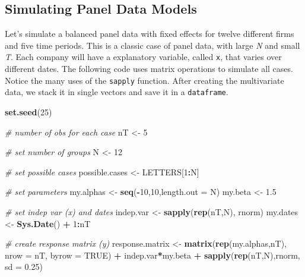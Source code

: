 \documentclass[11pt,]{book}
\newenvironment{Shaded}{\begin{snugshade}}{\end{snugshade}}
\newcommand{\KeywordTok}[1]{\textcolor[rgb]{0.27,0.27,0.27}{\textbf{#1}}}
\newcommand{\DataTypeTok}[1]{\textcolor[rgb]{0.27,0.27,0.27}{#1}}
\newcommand{\DecValTok}[1]{\textcolor[rgb]{0.06,0.06,0.06}{#1}}
\newcommand{\FloatTok}[1]{\textcolor[rgb]{0.06,0.06,0.06}{#1}}
\newcommand{\StringTok}[1]{\textcolor[rgb]{0.5,0.5,0.5}{#1}}
\newcommand{\CommentTok}[1]{\textcolor[rgb]{0.56,0.35,0.01}{\textit{#1}}}
\newcommand{\OtherTok}[1]{\textcolor[rgb]{0.56,0.35,0.01}{#1}}
\newcommand{\OperatorTok}[1]{\textcolor[rgb]{0.81,0.36,0.00}{\textbf{#1}}}
\newcommand{\NormalTok}[1]{#1}
\begin{document}
\subsection{Simulating Panel Data
Models}\label{simulating-panel-data-models}

Let's simulate a balanced panel data with fixed effects for twelve
different firms and five time periods. This is a classic case of panel
data, with large \emph{N} and small \emph{T}. Each company will have a
explanatory variable, called \texttt{x}, that varies over different
dates. The following code uses matrix operations to simulate all cases.
Notice the many uses of the \texttt{sapply} function. After creating the
multivariate data, we stack it in single vectors and save it in a
\texttt{dataframe}.

\begin{Shaded}
\begin{Highlighting}[]
\KeywordTok{set.seed}\NormalTok{(}\DecValTok{25}\NormalTok{)}

\CommentTok{# number of obs for each case}
\NormalTok{nT <-}\StringTok{ }\DecValTok{5}

\CommentTok{# set number of groups}
\NormalTok{N <-}\StringTok{ }\DecValTok{12}

\CommentTok{# set possible cases}
\NormalTok{possible.cases <-}\StringTok{ }\NormalTok{LETTERS[}\DecValTok{1}\OperatorTok{:}\NormalTok{N]}

\CommentTok{# set parameters}
\NormalTok{my.alphas <-}\StringTok{ }\KeywordTok{seq}\NormalTok{(}\OperatorTok{-}\DecValTok{10}\NormalTok{,}\DecValTok{10}\NormalTok{,}\DataTypeTok{length.out =}\NormalTok{ N)}
\NormalTok{my.beta <-}\StringTok{ }\FloatTok{1.5}

\CommentTok{# set indep var (x) and dates}
\NormalTok{indep.var <-}\StringTok{ }\KeywordTok{sapply}\NormalTok{(}\KeywordTok{rep}\NormalTok{(nT,N), rnorm)}
\NormalTok{my.dates <-}\StringTok{ }\KeywordTok{Sys.Date}\NormalTok{() }\OperatorTok{+}\StringTok{ }\DecValTok{1}\OperatorTok{:}\NormalTok{nT}

\CommentTok{# create response matrix (y)}
\NormalTok{response.matrix <-}\StringTok{ }\KeywordTok{matrix}\NormalTok{(}\KeywordTok{rep}\NormalTok{(my.alphas,nT), }
                          \DataTypeTok{nrow =}\NormalTok{ nT, }
                          \DataTypeTok{byrow =} \OtherTok{TRUE}\NormalTok{) }\OperatorTok{+}\StringTok{ }
\StringTok{  }\NormalTok{indep.var}\OperatorTok{*}\NormalTok{my.beta }\OperatorTok{+}\StringTok{ }\KeywordTok{sapply}\NormalTok{(}\KeywordTok{rep}\NormalTok{(nT,N),rnorm, }\DataTypeTok{sd =} \FloatTok{0.25}\NormalTok{) }


\end{Highlighting}
\end{Shaded}
\end{document}
